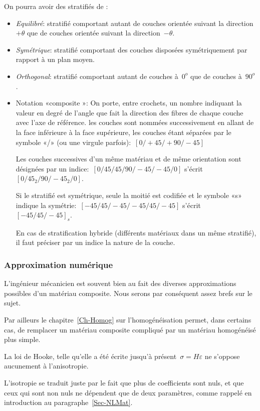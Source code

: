\medskip
On pourra avoir des stratifiés de :
\begin{itemize}
	\item \emph{Equilibré}: stratifié comportant autant de couches orientée suivant la direction $+\theta$ que de couches orientée suivant la direction~$-\theta$.
	\item \emph{Symétrique}: stratifié comportant des couches disposées symétriquement par
		 rapport à un plan moyen.
	\item \emph{Orthogonal}: stratifié comportant autant de couches à~$0^o$ que de couches à~$90^o$.
	\item Notation «composite »:
		On porte, entre crochets, un nombre indiquant la valeur en degré de l'angle que fait la direction
		des fibres de chaque couche avec l'axe de référence. les couches sont nommées successivement
		en allant de la face inférieure à la face supérieure, les couches étant séparées par le symbole
		«/» (ou une virgule parfois):~$[0/+45/+90/-45]$

		Les couches successives d'un même matériau et de même orientation sont désignées
		par un indice:~$[0/45/45/90/-45/-45/0]$ s'écrit~$[0/45_2/90/-45_2/0]$.
		
		Si le stratifié est symétrique, seule la moitié est codifiée et le symbole «s» indique la symétrie:~$[-45/45/-45/-45/45/-45]$ s'écrit~$[-45/45/-45]_s$.

		En cas de stratification hybride (différents matériaux dans un même stratifié), il faut préciser par un indice la nature de la couche.
\end{itemize}


\medskip
\subsubsection{Approximation numérique}

L'ingénieur mécanicien est souvent bien au fait des diverses approximations possibles d'un matériau composite. Nous serons par conséquent assez brefs sur le sujet.

Par ailleurs le chapitre~\ref{Ch-Homog} sur l'homogénéisation permet, dans certains cas, de remplacer un matériau composite compliqué par un matériau homogénéisé plus simple.

\medskip
La loi de Hooke, telle qu'elle a été écrite jusqu'à présent~$\sigma=H\varepsilon$ ne s'oppose aucunement à l'anisotropie.

L'isotropie se traduit juste par le fait que plus de coefficients sont nuls, et que ceux qui sont non nuls ne dépendent que de deux paramètres, comme rappelé en introduction au paragraphe~\ref{Sec-NLMat}.

